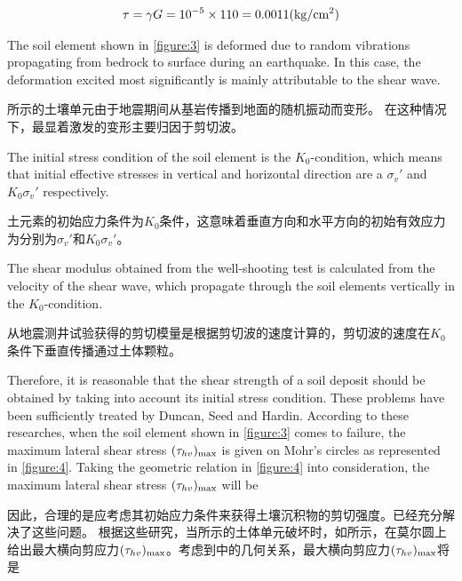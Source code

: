 \begin{align}
    \tau=\gamma{}G=10^{-5}\times{}110=0.0011(\rm{kg/cm^2})
    \label{equation:5}
\end{align}


\begin{paracol}{2}
    
    The soil element shown in \autoref{figure:3} is deformed due to random vibrations propagating from bedrock to surface during an earthquake. In this case, the deformation excited most significantly is mainly attributable to the shear wave.

    \switchcolumn

    所示的土壤单元由于地震期间从基岩传播到地面的随机振动而变形。 在这种情况下，最显着激发的变形主要归因于剪切波。      \switchcolumn*

    The initial stress condition of the soil element is the $K_0$-condition, which means that initial effective stresses in vertical and horizontal direction are a $\sigma_v'$ and $K_0\sigma_v'$ respectively.

    \switchcolumn
       
    土元素的初始应力条件为$K_0$条件，这意味着垂直方向和水平方向的初始有效应力为分别为$\sigma_v'$和$K_0\sigma_v'$。
    
    \switchcolumn*

    The shear modulus obtained from the well-shooting test is calculated from the velocity of the shear wave, which propagate through the soil elements vertically in the $K_0$-condition.

    \switchcolumn
       
    从地震测井试验获得的剪切模量是根据剪切波的速度计算的，剪切波的速度在$K_0$条件下垂直传播通过土体颗粒。

\end{paracol}



\begin{paracol}{2}
    
    Therefore, it is reasonable that the shear strength of a soil deposit should be obtained by taking into account its initial stress condition. These problems have been sufficiently treated by Duncan, Seed and Hardin. According to these researches, when the soil element shown in \autoref{figure:3} comes to failure, the maximum lateral shear stress $(\tau_{hv})_{\rm{max}}$ is given on Mohr's circles as represented in \autoref{figure:4}. Taking the geometric relation in \autoref{figure:4} into consideration, the maximum lateral shear stress $(\tau_{hv})_{\rm{max}}$ will be

    \switchcolumn

    因此，合理的是应考虑其初始应力条件来获得土壤沉积物的剪切强度。\citet{Duncan1969101,Seed19711099,Hardin1973667}已经充分解决了这些问题。 根据这些研究，当所示的土体单元破坏时，如所示，在莫尔圆上给出最大横向剪应力$(\tau_{hv})_{\rm{max}}$。考虑到中的几何关系，最大横向剪应力$(\tau_{hv})_{\rm{max}}$将是

\end{paracol}

